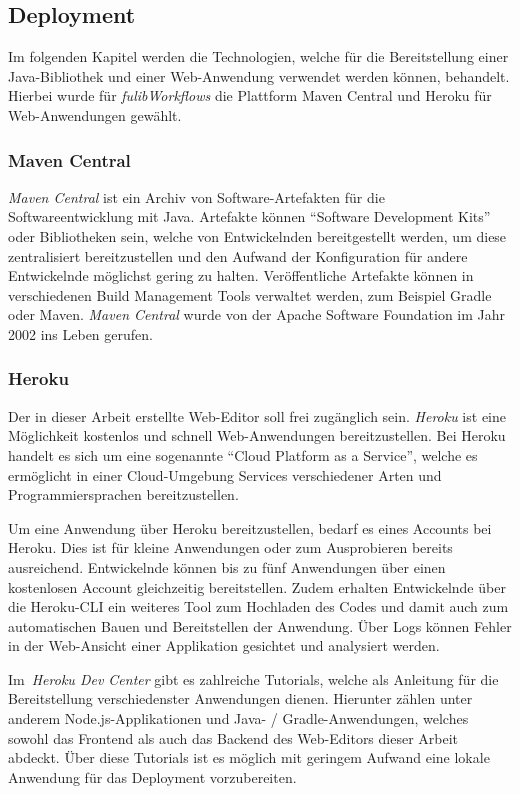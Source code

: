 \subsection{Deployment}\label{subsec:deployment}
Im folgenden Kapitel werden die Technologien, welche für die Bereitstellung einer Java-Bibliothek und einer Web-Anwendung verwendet werden können, behandelt.
Hierbei wurde für \textit{fulibWorkflows} die Plattform Maven Central und Heroku für Web-Anwendungen gewählt.

\subsubsection{Maven Central}\label{subsubsec:mavencentral}
\textit{Maven Central} ist ein Archiv von Software-Artefakten für die Softwareentwicklung mit Java.
Artefakte können ``Software Development Kits'' oder Bibliotheken sein, welche von Entwickelnden bereitgestellt werden, um diese zentralisiert bereitzustellen
und den Aufwand der Konfiguration für andere Entwickelnde möglichst gering zu halten.
Veröffentliche Artefakte können in verschiedenen Build Management Tools verwaltet werden, zum Beispiel Gradle oder Maven.
\textit{Maven Central} wurde von der Apache Software Foundation im Jahr 2002 ins Leben gerufen\cite*{maven}.

\subsubsection{Heroku}\label{subsubsec:heroku}
Der in dieser Arbeit erstellte Web-Editor soll frei zugänglich sein.
\textit{Heroku} ist eine Möglichkeit kostenlos und schnell Web-Anwendungen bereitzustellen.
Bei Heroku handelt es sich um eine sogenannte ``Cloud Platform as a Service'', welche es ermöglicht in einer Cloud-Umgebung
Services verschiedener Arten und Programmiersprachen bereitzustellen\cite*{heroku}.

Um eine Anwendung über Heroku bereitzustellen, bedarf es eines Accounts bei Heroku.
Dies ist für kleine Anwendungen oder zum Ausprobieren bereits ausreichend.
Entwickelnde können bis zu fünf Anwendungen über einen kostenlosen Account gleichzeitig bereitstellen.
Zudem erhalten Entwickelnde über die Heroku-\ac{CLI} ein weiteres Tool zum Hochladen des Codes und damit auch zum automatischen
Bauen und Bereitstellen der Anwendung.
Über Logs können Fehler in der Web-Ansicht einer Applikation gesichtet und analysiert werden.

Im~\textit{Heroku Dev Center} gibt es zahlreiche Tutorials, welche als Anleitung für die Bereitstellung verschiedenster Anwendungen dienen.
Hierunter zählen unter anderem Node.js-Applikationen und Java- / Gradle-Anwendungen, welches sowohl das Frontend als auch das Backend
des Web-Editors dieser Arbeit abdeckt\cite*{herokuDev}.
Über diese Tutorials ist es möglich mit geringem Aufwand eine lokale Anwendung für das Deployment vorzubereiten.
